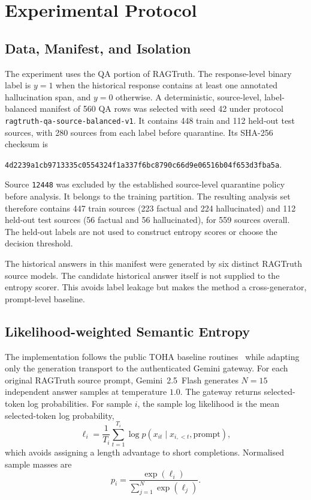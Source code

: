 \documentclass[11pt,a4paper]{article}
\begin{document}
\section{Experimental Protocol}

\subsection{Data, Manifest, and Isolation}

The experiment uses the QA portion of RAGTruth.  The response-level binary label is $y=1$ when the historical response contains at least one annotated hallucination span, and $y=0$ otherwise.  A deterministic, source-level, label-balanced manifest of 560 QA rows was selected with seed 42 under protocol \texttt{ragtruth-qa-source-balanced-v1}.  It contains 448 train and 112 held-out test sources, with 280 sources from each label before quarantine.  Its SHA-256 checksum is
\begin{center}
\small\texttt{4d2239a1cb9713335c0554324f1a337f6bc8790c66d9e06516b04f653d3fba5a}.
\end{center}

Source \texttt{12448} was excluded by the established source-level quarantine policy before analysis.  It belongs to the training partition.  The resulting analysis set therefore contains 447 train sources (223 factual and 224 hallucinated) and 112 held-out test sources (56 factual and 56 hallucinated), for 559 sources overall.  The held-out labels are not used to construct entropy scores or choose the decision threshold.

The historical answers in this manifest were generated by six distinct RAGTruth source models.  The candidate historical answer itself is not supplied to the entropy scorer.  This avoids label leakage but makes the method a cross-generator, prompt-level baseline.

\subsection{Likelihood-weighted Semantic Entropy}

The implementation follows the public TOHA baseline routines~\cite{toha} while adapting only the generation transport to the authenticated Gemini gateway.  For each original RAGTruth source prompt, Gemini~2.5~Flash generates $N=15$ independent answer samples at temperature $1.0$.  The gateway returns selected-token log probabilities.  For sample $i$, the sample log likelihood is the mean selected-token log probability,
\begin{equation}
  \ell_i=\frac{1}{T_i}\sum_{t=1}^{T_i}\log p(x_{it}\mid x_{i,<t},\mathrm{prompt}),
\end{equation}
which avoids assigning a length advantage to short completions.  Normalised sample masses are
\begin{equation}
  p_i=\frac{\exp(\ell_i)}{\sum_{j=1}^{N}\exp(\ell_j)}.
\end{equation}
\end{document}
